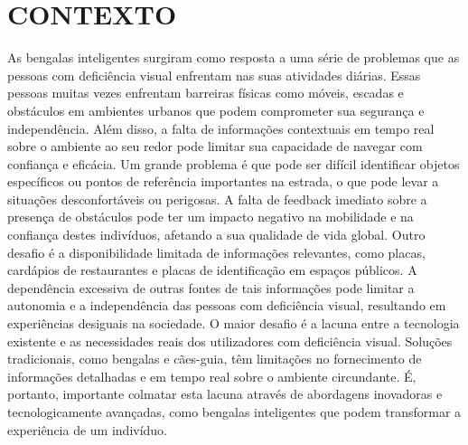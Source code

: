 \section{CONTEXTO}
As bengalas inteligentes surgiram como resposta a uma série de problemas que as pessoas com deficiência visual enfrentam nas suas atividades diárias. Essas pessoas muitas vezes enfrentam barreiras físicas como móveis, escadas e obstáculos em ambientes urbanos que podem comprometer sua segurança e independência. Além disso, a falta de informações contextuais em tempo real sobre o ambiente ao seu redor pode limitar sua capacidade de navegar com confiança e eficácia.
Um grande problema é que pode ser difícil identificar objetos específicos ou pontos de referência importantes na estrada, o que pode levar a situações desconfortáveis ou perigosas. A falta de feedback imediato sobre a presença de obstáculos pode ter um impacto negativo na mobilidade e na confiança destes indivíduos, afetando a sua qualidade de vida global. Outro desafio é a disponibilidade limitada de informações relevantes, como placas, cardápios de restaurantes e placas de identificação em espaços públicos. A dependência excessiva de outras fontes de tais informações pode limitar a autonomia e a independência das pessoas com deficiência visual, resultando em experiências desiguais na sociedade.
O maior desafio é a lacuna entre a tecnologia existente e as necessidades reais dos utilizadores com deficiência visual. Soluções tradicionais, como bengalas e cães-guia, têm limitações no fornecimento de informações detalhadas e em tempo real sobre o ambiente circundante. É, portanto, importante colmatar esta lacuna através de abordagens inovadoras e tecnologicamente avançadas, como bengalas inteligentes que podem transformar a experiência de um indivíduo.



